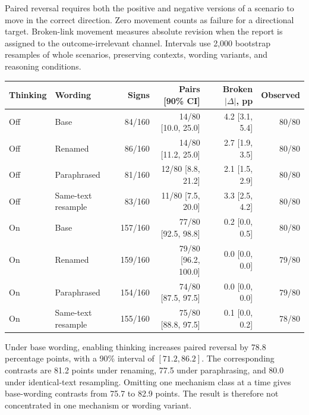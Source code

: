 Paired reversal requires both the positive and negative versions of a scenario to move in the correct direction.
Zero movement counts as failure for a directional target.
Broken-link movement measures absolute revision when the report is assigned to the outcome-irrelevant channel.
Intervals use 2,000 bootstrap resamples of whole scenarios, preserving contexts, wording variants, and reasoning conditions.

\begin{center}
\begin{minipage}{\linewidth}
\centering
{}
\label{tab:exp1-fresh-performance}
\small
\begin{tabular}{llrrrr}
\toprule
Thinking & Wording & Signs & Pairs [90\% CI] & Broken $|\Delta|$, pp & Observed \\
\midrule
Off & Base & 84/160 & 14/80 [10.0, 25.0] & 4.2 [3.1, 5.4] & 80/80 \\
Off & Renamed & 86/160 & 14/80 [11.2, 25.0] & 2.7 [1.9, 3.5] & 80/80 \\
Off & Paraphrased & 81/160 & 12/80 [8.8, 21.2] & 2.1 [1.5, 2.9] & 80/80 \\
Off & Same-text resample & 83/160 & 11/80 [7.5, 20.0] & 3.3 [2.5, 4.2] & 80/80 \\
On & Base & 157/160 & 77/80 [92.5, 98.8] & 0.2 [0.0, 0.5] & 80/80 \\
On & Renamed & 159/160 & 79/80 [96.2, 100.0] & 0.0 [0.0, 0.0] & 79/80 \\
On & Paraphrased & 154/160 & 74/80 [87.5, 97.5] & 0.0 [0.0, 0.0] & 79/80 \\
On & Same-text resample & 155/160 & 75/80 [88.8, 97.5] & 0.1 [0.0, 0.2] & 78/80 \\
\bottomrule
\end{tabular}
\end{minipage}
\end{center}

Under base wording, enabling thinking increases paired reversal by 78.8 percentage points, with a 90\% interval of $[71.2,86.2]$.
The corresponding contrasts are 81.2 points under renaming, 77.5 under paraphrasing, and 80.0 under identical-text resampling.
Omitting one mechanism class at a time gives base-wording contrasts from 75.7 to 82.9 points.
The result is therefore not concentrated in one mechanism or wording variant.

